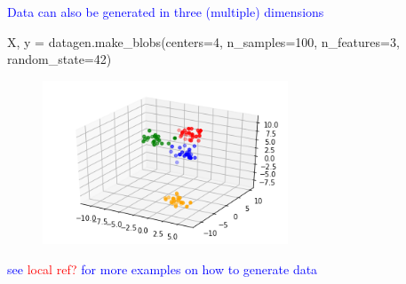 \textcolor{blue}{Data can also be generated in three (multiple) dimensions}

\begin{python}
X, y = datagen.make_blobs(centers=4, n_samples=100, n_features=3, random_state=42)
\end{python}



\begin{figure}
\centering
\includegraphics[width=0.65\textwidth]{./sync_imgs/datagen/blobs/3dimg.png}
\label{fig:datagen_blobs_3dimg}
\end{figure}



\textcolor{blue}{see \textcolor{red}{local ref?} for more examples on how to generate data}
